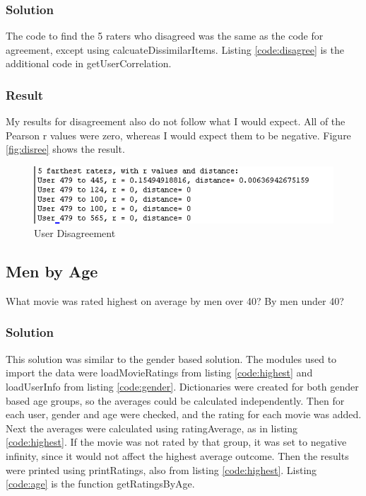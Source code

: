 \documentclass[paper=a4, fontsize=11pt]{scrartcl} %
\numberwithin{equation}{section} %
\numberwithin{figure}{section} %
\numberwithin{table}{section} %
\begin{document}
\subsubsection{Solution}
The code to find the 5 raters who disagreed was the same as the code for agreement, except using calcuateDissimilarItems.
Listing \ref{code:disagree} is the additional code in getUserCorrelation.\\



\subsubsection{Result}
My results for disagreement also do not follow what I would expect.
All of the Pearson r values were zero, whereas I would expect them to be negative.
Figure \ref{fig:disree} shows the result.

\begin{figure}[H]
\includegraphics[width=1\textwidth]{pics/disagree}
\caption{User Disagreement}
\label{fig:disagree}
\end{figure}

\subsection{Men by Age}
What movie was rated highest on average by men over 40? 
By men under 40?

\subsubsection{Solution}
This solution was similar to the gender based solution. 
The modules used to import the data were loadMovieRatings from listing \ref{code:highest} and loadUserInfo from listing \ref{code:gender}.
Dictionaries were created for both gender based age groups, so the averages could be calculated independently.
Then for each user, gender and age were checked, and the rating for each movie was added.
Next the averages were calculated using ratingAverage, as in listing \ref{code:highest}.
If the movie was not rated by that group, it was set to negative infinity, since it would not affect the highest average outcome.
Then the results were printed using printRatings, also from listing \ref{code:highest}.
Listing \ref{code:age} is the function getRatingsByAge.\\
\end{document}
